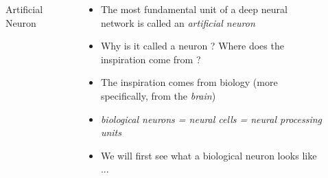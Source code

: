 \begin{frame}
\end{frame}

\begin{frame}
	\begin{columns}
		\begin{overlayarea}{\textwidth}{\textheight}
			\begin{figure}
				\centering
				
				\caption{Artificial Neuron}
			\end{figure}
		\end{overlayarea}

		\begin{overlayarea}{\textwidth}{\textheight}
			\begin{itemize}\justifying
				\item<1-> The most fundamental unit of a deep neural network is called an \textit{artificial neuron}
				\item<2-> Why is it called a neuron ? Where does the inspiration come from ?
				\item<3-> The inspiration comes from biology (more specifically, from the \textit{brain})
				\item<4-> \textit{biological neurons = neural cells = neural processing units}
				\item<5-> We will first see what a biological neuron looks like ...
			\end{itemize}
		\end{overlayarea}
	\end{columns}
\end{frame}


